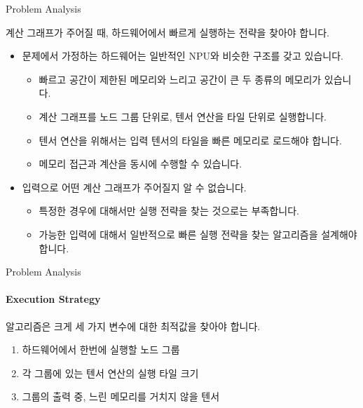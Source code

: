 \begin{frame}{Problem Analysis}

\begin{tcolorbox}[title={문제의 목표}]
  계산 그래프가 주어질 때, 하드웨어에서 빠르게 실행하는 전략을 찾아야 합니다.
\end{tcolorbox}
\pause

\begin{itemize}
  \item 문제에서 가정하는 하드웨어는 일반적인 NPU와 비슷한 구조를 갖고 있습니다.
  \begin{itemize}
    \item 빠르고 공간이 제한된 메모리와 느리고 공간이 큰 두 종류의 메모리가 있습니다.
    \item 계산 그래프를 노드 그룹 단위로, 텐서 연산을 타일 단위로 실행합니다.
    \item 텐서 연산을 위해서는 입력 텐서의 타일을 빠른 메모리로 로드해야 합니다.
    \item 메모리 접근과 계산을 동시에 수행할 수 있습니다.
  \end{itemize}
  \pause
  \item 입력으로 어떤 계산 그래프가 주어질지 알 수 없습니다.
  \begin{itemize}
    \item 특정한 경우에 대해서만 실행 전략을 찾는 것으로는 부족합니다.
    \item 가능한 입력에 대해서 일반적으로 빠른 실행 전략을 찾는 알고리즘을 설계해야 합니다.
  \end{itemize}
\end{itemize}
\end{frame}

\begin{frame}{Problem Analysis}
\framesubtitle{Execution Strategy}

알고리즘은 크게 세 가지 변수에 대한 최적값을 찾아야 합니다.
\begin{enumerate}
  \item 하드웨어에서 한번에 실행할 노드 그룹
  \item 각 그룹에 있는 텐서 연산의 실행 타일 크기
  \item 그룹의 출력 중, 느린 메모리를 거치지 않을 텐서
\end{enumerate}
\end{frame}

\newcommand{\animframe}[1]{\resizebox{\linewidth}{!}{}}

